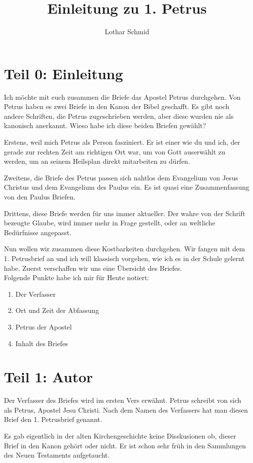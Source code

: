 \documentclass[fontsize=16pt]{mybib}
\title{Einleitung zu 1. Petrus}
\author{Lothar Schmid}
\date{}
\begin{document}
\mytitlepage
\tableofcontents
\newpage

\section{Teil 0: Einleitung}
Ich möchte mit euch zusammen die Briefe das Apostel Petrus durchgehen. Von Petrus haben es zwei Briefe in den Kanon der Bibel geschafft. Es gibt noch andere Schriften, die  Petrus zugeschrieben werden, aber diese wurden nie als kanonisch anerkannt. Wieso habe ich diese beiden Briefen gewählt?

Erstens, weil mich Petrus als Person fasziniert. Er ist einer wie du und ich, der gerade zur rechten Zeit am richtigen Ort war, um von Gott auserwählt zu werden, um an seinem Heilsplan direkt mitarbeiten zu dürfen.

Zweitens, die Briefe des Petrus passen sich nahtlos dem Evangelium von Jesus Christus und dem Evangelium des Paulus ein. Es ist quasi eine Zusammenfassung von den Paulus Briefen.

Drittens, diese Briefe werden für uns immer aktueller. Der wahre von der Schrift bezeugte Glaube, wird immer mehr in Frage gestellt, oder an weltliche Bedürfnisse angepasst.

Nun wollen wir zusammen diese Kostbarkeiten durchgehen. Wir fangen mit dem 1. Petrusbrief an und ich will klassisch vorgehen, wie ich es in der Schule gelernt habe. Zuerst verschaffen wir uns eine Übersicht des Briefes.\\
Folgende Punkte habe ich mir für Heute notiert:
\begin{enumerate}
    \item Der Verfasser
    \item Ort und Zeit der Abfassung
    \item Petrus der Apostel
    \item Inhalt des Briefes
\end{enumerate}

\section{Teil 1: Autor}
 Der Verfasser des Briefes wird im ersten Vers erwähnt. Petrus schreibt von sich als Petrus, Apostel Jesu Christi. Nach dem Namen des Verfassers hat man diesen Brief den 1. Petrusbrief genannt.

Es gab eigentlich in der alten Kirchengeschichte keine Disskusionen ob, dieser Brief in den Kanon gehört oder nicht. Er ist schon sehr früh in den Sammlungen des Neuen Testaments aufgetaucht. 
\end{document}
